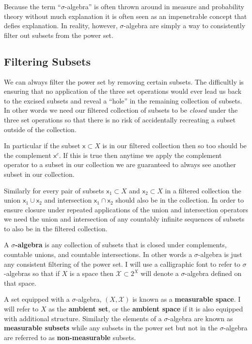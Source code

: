 \documentclass[
  letterpaper,
  DIV=11,
  numbers=noendperiod]{scrartcl}
\begin{document}
Because the term ``\(\sigma\)-algebra'' is often thrown around in
measure and probability theory without much explanation it is often seen
as an impenetrable concept that defies explanation. In reality, however,
\(\sigma\)-algebra are simply a way to consistently filter out subsets
from the power set.

\hypertarget{filtering-subsets}{%
\subsection{Filtering Subsets}\label{filtering-subsets}}

We can always filter the power set by removing certain subsets. The
difficultly is ensuring that no application of the three set operations
would ever lead us back to the excised subsets and reveal a ``hole'' in
the remaining collection of subsets. In other words we need our filtered
collection of subsets to be \emph{closed} under the three set operations
so that there is no risk of accidentally recreating a subset outside of
the collection.

In particular if the subset \(\mathsf{x} \subset X\) is in our filtered
collection then so too should be the complement \(\mathsf{x}^{c}\). If
this is true then anytime we apply the complement operator to a subset
in our collection we are guaranteed to always see another subset in our
collection.

Similarly for every pair of subsets \(\mathsf{x}_{1} \subset X\) and
\(\mathsf{x}_{2} \subset X\) in a filtered collection the union
\(\mathsf{x}_{1} \cup \mathsf{x}_{2}\) and intersection
\(\mathsf{x}_{1} \cap \mathsf{x}_{2}\) should also be in the collection.
In order to ensure closure under repeated applications of the union and
intersection operators we need the union and intersection of any
countably infinite sequences of subsets to also be in the filtered
collection.

A \textbf{\(\sigma\)-algebra} is any collection of subsets that is
closed under complements, countable unions, and countable intersections.
In other words a \(\sigma\)-algebra is just any consistent filtering of
the power set. I will use a calligraphic font to refer to
\(\sigma\)-algebras so that if \(X\) is a space then
\(\mathcal{X} \subset 2^{X}\) will denote a \(\sigma\)-algebra defined
on that space.

A set equipped with a \(\sigma\)-algebra, \((X, \mathcal{X})\) is known
as a \textbf{measurable space}. I will refer to \(X\) as the
\textbf{ambient set}, or the \textbf{ambient space} if it is also
equipped with additional structure. Similarly the elements of a
\(\sigma\)-algebra are known as \textbf{measurable subsets} while any
subsets in the power set but not in the \(\sigma\)-algebra are referred
to as \textbf{non-measurable} subsets.
\end{document}
